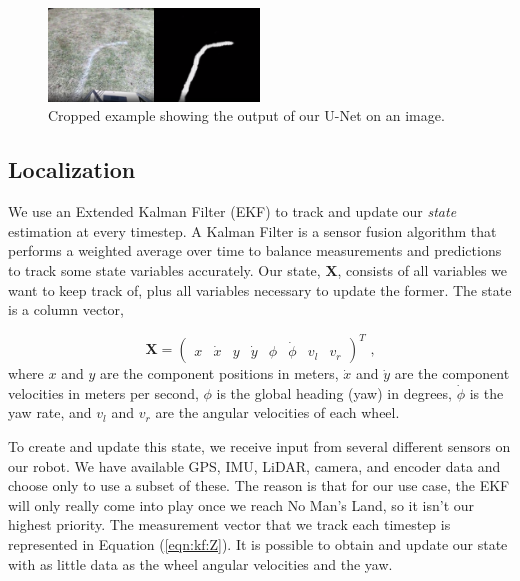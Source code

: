 \begin{figure}[H]
    \centering
    \includegraphics[width=0.5\textwidth]{images/software/unetexample.png}
    \caption{Cropped example showing the output of our U-Net on an image.}
\end{figure}

\subsection{Localization}

We use an Extended Kalman Filter (EKF) to track and update our \textit{state} estimation at every timestep. A Kalman Filter is a sensor fusion algorithm that performs a weighted average over time to balance measurements and predictions to track some state variables accurately. Our state, $\boldsymbol{X}$, consists of all variables we want to keep track of, plus all variables necessary to update the former. The state is a column vector,

\begin{equation}
    \boldsymbol{X} = \begin{pmatrix}
    x & \dot{x} & y & \dot{y} & \phi & \dot{\phi} & v_l & v_r
    \end{pmatrix} ^T
    \textrm{ ,}
    \label{eqn:kf:X}
\end{equation}
where $x$ and $y$ are the component positions in meters, $\dot{x}$ and $\dot{y}$ are the component velocities in meters per second, $\phi$ is the global heading (yaw) in degrees, $\dot{\phi}$ is the yaw rate, and $v_l$ and $v_r$ are the angular velocities of each wheel. 

To create and update this state, we receive input from several different sensors on our robot. We have available GPS, IMU, LiDAR, camera, and encoder data and choose only to use a subset of these. The reason is that for our use case, the EKF will only really come into play once we reach No Man's Land, so it isn't our highest priority. The measurement vector that we track each timestep is represented in Equation
(\ref{eqn:kf:Z}). It is possible to obtain and update our state with as little data as the wheel angular velocities and the yaw.

